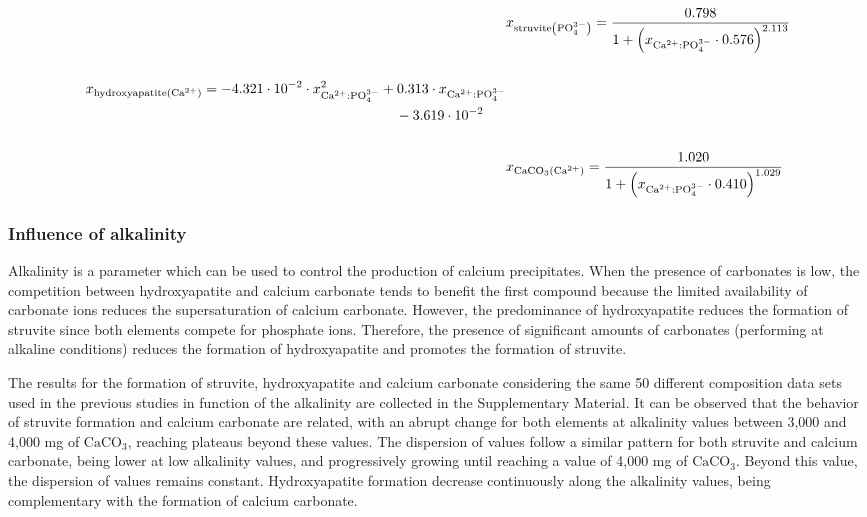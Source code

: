 \begin{refsection}[referencesCh3]
\begin{align}
&x_{\text{struvite} \left(\text{PO}_{4}^{3-}\right) }= \frac{0.798}{1+\left(x_{\text{Ca}^{2+}:\text{PO}_{4}^{3-}} \cdot 0.576\right)^{2.113}} \label{eq:sigmoidal_Ca_StrYield} \\
\nonumber \\
\begin{split}
& x_{\text{hydroxyapatite} \left(\text{Ca}^{2+}\right)} = -4.321 \cdot 10^{-2} \cdot x_{\text{Ca}^{2+}:\text{PO}_{4}^{3-}}^{2} + 0.313 \cdot x_{\text{Ca}^{2+}:\text{PO}_{4}^{3-}} \\& \hspace{7.8cm} - 3.619 \cdot 10^{-2} \label{eq:sigmoidal_Ca_HAP}
\end{split}
\\
\nonumber \\
&  x_{\text{CaCO}_{3} \left(\text{Ca}^{2+}\right)} = \frac{1.020}{1+\left(x_{\text{Ca}^{2+}:\text{PO}_{4}^{3-}} \cdot 0.410 \right)^{1.029}} \label{eq:sigmoidal_CaCaCO3}
\end{align}

\subsubsection{Influence of alkalinity}
Alkalinity is a parameter which can be used to control the production of calcium precipitates. When the presence of carbonates is low, the competition between hydroxyapatite and calcium carbonate tends to benefit the first compound because the limited availability of carbonate ions reduces the supersaturation of calcium carbonate. However, the predominance of hydroxyapatite reduces the formation of struvite since both elements compete for phosphate ions. Therefore, the presence of significant amounts of carbonates (performing at alkaline conditions) reduces the formation of hydroxyapatite and promotes the formation of struvite. 

The results for the formation of struvite, hydroxyapatite and calcium carbonate considering the same 50 different composition data sets used in the previous studies  in function of the alkalinity are collected in the Supplementary Material.
It can be observed that the behavior of struvite formation and calcium carbonate are related, with an abrupt change for both elements at alkalinity values between 3,000 and 4,000 mg of $\text{CaCO}_{3}$, reaching plateaus beyond these values. The dispersion of values follow a similar pattern for both struvite and calcium carbonate, being lower at low alkalinity values, and progressively growing until reaching a value of 4,000 mg of $\text{CaCO}_{3}$. Beyond this value, the dispersion of  values remains constant. Hydroxyapatite formation decrease continuously along the alkalinity values, being complementary with the formation of calcium carbonate.


\end{refsection}
